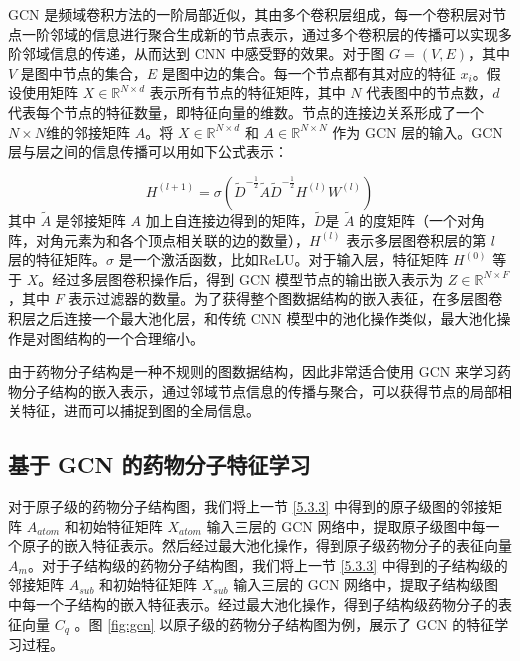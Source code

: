 GCN 是频域卷积方法的一阶局部近似，其由多个卷积层组成，每一个卷积层对节点一阶邻域的信息进行聚合生成新的节点表示，通过多个卷积层的传播可以实现多阶邻域信息的传递，从而达到 CNN 中感受野的效果。对于图 $G=(V,E)$，其中 $V$ 是图中节点的集合，$E$ 是图中边的集合。每一个节点都有其对应的特征 $x_i$。假设使用矩阵 $X \in \mathbb{R}^{N\times d}$ 表示所有节点的特征矩阵，其中 $N$ 代表图中的节点数，$d$ 代表每个节点的特征数量，即特征向量的维数。节点的连接边关系形成了一个$N\times N$维的邻接矩阵 $A$。将 $X \in \mathbb{R}^{N\times d}$ 和 $A \in \mathbb{R}^{N\times N}$ 作为 GCN 层的输入。GCN层与层之间的信息传播可以用如下公式表示：

\begin{equation}
  H^{(l+1)} = \sigma(\tilde{D}^{-\frac{1}{2}}\tilde{A}\tilde{D}^{-\frac{1}{2}}H^{(l)}W^{(l)})
\end{equation}
其中 $\tilde{A}$ 是邻接矩阵 $A$ 加上自连接边得到的矩阵，$\tilde{D}$是 $\tilde{A}$ 的度矩阵（一个对角阵，对角元素为和各个顶点相关联的边的数量），$H^{(l)}$ 表示多层图卷积层的第 $l$ 层的特征矩阵。$\sigma$ 是一个激活函数，比如ReLU。对于输入层，特征矩阵 $H^{(0)}$ 等于 $X$。经过多层图卷积操作后，得到 GCN 模型节点的输出嵌入表示为 $Z \in \mathbb{R}^{N\times F}$，其中 $F$ 表示过滤器的数量。为了获得整个图数据结构的嵌入表征，在多层图卷积层之后连接一个最大池化层，和传统 CNN 模型中的池化操作类似，最大池化操作是对图结构的一个合理缩小。

由于药物分子结构是一种不规则的图数据结构，因此非常适合使用 GCN 来学习药物分子结构的嵌入表示，通过邻域节点信息的传播与聚合，可以获得节点的局部相关特征，进而可以捕捉到图的全局信息。

\subsection{基于 GCN 的药物分子特征学习}
对于原子级的药物分子结构图，我们将上一节 \ref{5.3.3} 中得到的原子级图的邻接矩阵 $A_{atom}$ 和初始特征矩阵 $X_{atom}$ 输入三层的 GCN 网络中，提取原子级图中每一个原子的嵌入特征表示。然后经过最大池化操作，得到原子级药物分子的表征向量 $A_m$。对于子结构级的药物分子结构图，我们将上一节 \ref{5.3.3} 中得到的子结构级的邻接矩阵 $A_{sub}$ 和初始特征矩阵 $X_{sub}$ 输入三层的 GCN 网络中，提取子结构级图中每一个子结构的嵌入特征表示。经过最大池化操作，得到子结构级药物分子的表征向量 $C_q$ 。图 \ref{fig:gcn} 以原子级的药物分子结构图为例，展示了 GCN 的特征学习过程。


